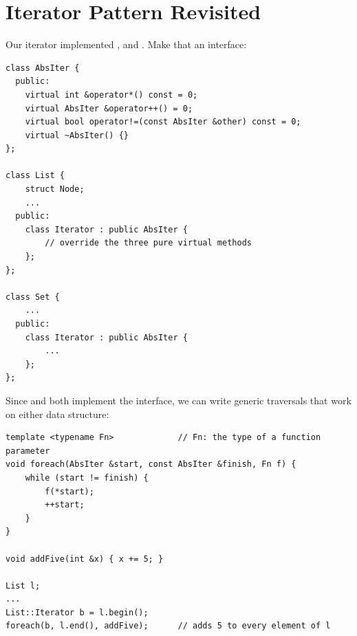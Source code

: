 \section{Iterator Pattern Revisited}
Our iterator implemented \code{*}, \code{++} and \code{!=}. Make that an
interface:
\begin{lstlisting}[style=cpp]
class AbsIter {
  public:
    virtual int &operator*() const = 0;
    virtual AbsIter &operator++() = 0;
    virtual bool operator!=(const AbsIter &other) const = 0;
    virtual ~AbsIter() {}
};

class List {
    struct Node;
    ...
  public:
    class Iterator : public AbsIter {
        // override the three pure virtual methods
    };
};

class Set {
    ...
  public:
    class Iterator : public AbsIter {
        ...
    };
};
\end{lstlisting}
Since  and  both implement the
 interface, we can write generic traversals that work on either
data structure:
\begin{lstlisting}[style=cpp]
template <typename Fn>             // Fn: the type of a function parameter
void foreach(AbsIter &start, const AbsIter &finish, Fn f) {
    while (start != finish) {
        f(*start);
        ++start;
    }
}

void addFive(int &x) { x += 5; }

List l;
...
List::Iterator b = l.begin();
foreach(b, l.end(), addFive);      // adds 5 to every element of l
\end{lstlisting}
\begin{center}
\end{center}

